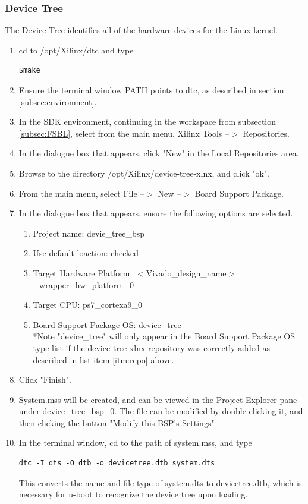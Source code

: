 \documentclass[12pt]{article}
\begin{document}
\subsubsection{Device Tree}
The Device Tree identifies all of the hardware devices for the Linux kernel.
\begin{enumerate}
\item  cd to /opt/Xilinx/dtc and type 
\begin{lstlisting}
$make
\end{lstlisting}
\item Ensure the terminal window PATH points to dtc, as described in section \ref{subsec:environment}.
\item In the SDK environment, continuing in the workspace from subsection \ref{subsec:FSBL}, select from the main menu, Xilinx Tools --$>$ Repositories.
\item In the dialogue box that appears, click "New" in the Local Repositories area.
\item Browse to the directory /opt/Xilinx/device-tree-xlnx, and click "ok".\label{itm:repo}
\item From the main menu, select File --$>$ New --$>$ Board Support Package.
\item In the dialogue box that appears, ensure the following options are selected.
\begin{enumerate}
\item Project name: devie\_tree\_bsp
\item Use default loaction: checked
\item Target Hardware Platform: $<$Vivado\_design\_name$>$\_wrapper\_hw\_platform\_0
\item Target CPU: ps7\_cortexa9\_0
\item Board Support Package OS: device\_tree
\\ *Note "device\_tree" will only appear in the Board Support Package OS type list if the device-tree-xlnx repository was correctly added as described in list item \ref{itm:repo} above. 
\end{enumerate}
\item Click "Finish".
\item System.mss will be created, and can be viewed in the Project Explorer pane under device\_tree\_bsp\_0.  The file can be modified by double-clicking it, and then clicking the button "Modify this BSP's Settings"
\item In the terminal window, cd to the path of system.mss, and type 
\begin{lstlisting}
dtc -I dts -O dtb -o devicetree.dtb system.dts
\end{lstlisting}
This converts the name and file type of system.dts to devicetree.dtb, which is necessary for u-boot to recognize the device tree upon loading.
\end{enumerate}
\end{document}
